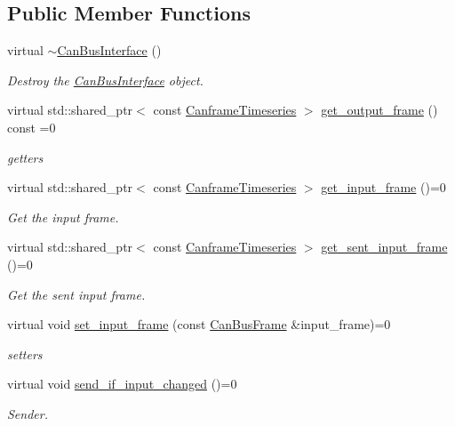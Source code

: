 \subsection*{Public Member Functions}
\begin{DoxyCompactItemize}
\item 
virtual \hyperlink{classblmc__drivers_1_1CanBusInterface_ac2c6e3ff3b49b04ad5f9f698eadc8690}{$\sim$\+Can\+Bus\+Interface} ()\hypertarget{classblmc__drivers_1_1CanBusInterface_ac2c6e3ff3b49b04ad5f9f698eadc8690}{}\label{classblmc__drivers_1_1CanBusInterface_ac2c6e3ff3b49b04ad5f9f698eadc8690}

\begin{DoxyCompactList}\small\item\em Destroy the \hyperlink{classblmc__drivers_1_1CanBusInterface}{Can\+Bus\+Interface} object. \end{DoxyCompactList}\item 
virtual std\+::shared\+\_\+ptr$<$ const \hyperlink{classblmc__drivers_1_1CanBusInterface_a2da2627c961927f48359ae7d7e1aa4da}{Canframe\+Timeseries} $>$ \hyperlink{classblmc__drivers_1_1CanBusInterface_ac169b1c119b707d2946a999b81fb5a46}{get\+\_\+output\+\_\+frame} () const =0
\begin{DoxyCompactList}\small\item\em getters \end{DoxyCompactList}\item 
virtual std\+::shared\+\_\+ptr$<$ const \hyperlink{classblmc__drivers_1_1CanBusInterface_a2da2627c961927f48359ae7d7e1aa4da}{Canframe\+Timeseries} $>$ \hyperlink{classblmc__drivers_1_1CanBusInterface_a40b62805094dc0a454695a988ab0d403}{get\+\_\+input\+\_\+frame} ()=0
\begin{DoxyCompactList}\small\item\em Get the input frame. \end{DoxyCompactList}\item 
virtual std\+::shared\+\_\+ptr$<$ const \hyperlink{classblmc__drivers_1_1CanBusInterface_a2da2627c961927f48359ae7d7e1aa4da}{Canframe\+Timeseries} $>$ \hyperlink{classblmc__drivers_1_1CanBusInterface_aca7e703983284a09c497c8182c0684d5}{get\+\_\+sent\+\_\+input\+\_\+frame} ()=0
\begin{DoxyCompactList}\small\item\em Get the sent input frame. \end{DoxyCompactList}\item 
virtual void \hyperlink{classblmc__drivers_1_1CanBusInterface_acf9305b548421e837950a0988172d57a}{set\+\_\+input\+\_\+frame} (const \hyperlink{classblmc__drivers_1_1CanBusFrame}{Can\+Bus\+Frame} \&input\+\_\+frame)=0
\begin{DoxyCompactList}\small\item\em setters \end{DoxyCompactList}\item 
virtual void \hyperlink{classblmc__drivers_1_1CanBusInterface_aa97ce2a204aa8354b8ea62af5f3820a2}{send\+\_\+if\+\_\+input\+\_\+changed} ()=0
\begin{DoxyCompactList}\small\item\em Sender. \end{DoxyCompactList}\end{DoxyCompactItemize}


